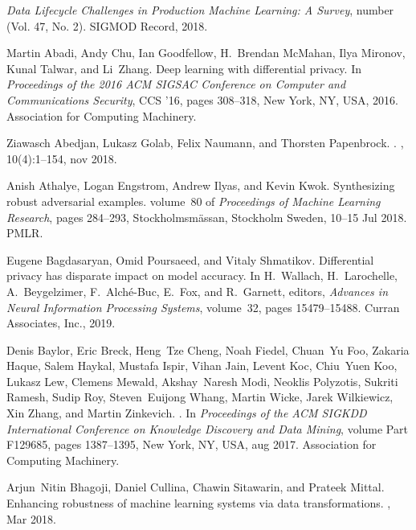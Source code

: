 \documentclass[11pt]{article}
\begin{document}
\begin{thebibliography}{10}

{\em {Data Lifecycle Challenges in Production Machine Learning: A Survey}},
  number (Vol. 47, No. 2). SIGMOD Record, 2018.

Martin Abadi, Andy Chu, Ian Goodfellow, H.~Brendan McMahan, Ilya Mironov, Kunal
  Talwar, and Li~Zhang.
\newblock Deep learning with differential privacy.
\newblock In {\em Proceedings of the 2016 ACM SIGSAC Conference on Computer and
  Communications Security}, CCS '16, pages 308--318, New York, NY, USA, 2016.
  Association for Computing Machinery.

Ziawasch Abedjan, Lukasz Golab, Felix Naumann, and Thorsten Papenbrock.
.
, 10(4):1--154, nov 2018.

Anish Athalye, Logan Engstrom, Andrew Ilyas, and Kevin Kwok.
\newblock Synthesizing robust adversarial examples.
\newblock volume~80 of {\em Proceedings of Machine Learning Research}, pages
  284--293, Stockholmsm{\"a}ssan, Stockholm Sweden, 10--15 Jul 2018. PMLR.

Eugene Bagdasaryan, Omid Poursaeed, and Vitaly Shmatikov.
\newblock Differential privacy has disparate impact on model accuracy.
\newblock In H.~Wallach, H.~Larochelle, A.~Beygelzimer, F.~Alch\'{e}-Buc,
  E.~Fox, and R.~Garnett, editors, {\em Advances in Neural Information
  Processing Systems}, volume~32, pages 15479--15488. Curran Associates, Inc.,
  2019.

Denis Baylor, Eric Breck, Heng~Tze Cheng, Noah Fiedel, Chuan~Yu Foo, Zakaria
  Haque, Salem Haykal, Mustafa Ispir, Vihan Jain, Levent Koc, Chiu~Yuen Koo,
  Lukasz Lew, Clemens Mewald, Akshay~Naresh Modi, Neoklis Polyzotis, Sukriti
  Ramesh, Sudip Roy, Steven~Euijong Whang, Martin Wicke, Jarek Wilkiewicz, Xin
  Zhang, and Martin Zinkevich.
.
\newblock In {\em Proceedings of the ACM SIGKDD International Conference on
  Knowledge Discovery and Data Mining}, volume Part F129685, pages 1387--1395,
  New York, NY, USA, aug 2017. Association for Computing Machinery.

Arjun~Nitin Bhagoji, Daniel Cullina, Chawin Sitawarin, and Prateek Mittal.
\newblock Enhancing robustness of machine learning systems via data
  transformations.
, Mar 2018.


\end{thebibliography}
\end{document}
